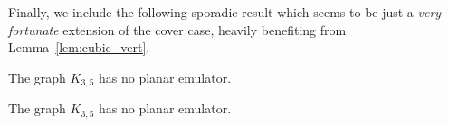 \documentclass[envcountsect,envcountsame]{llncs}
\renewenvironment{accumulate}{}{}
\begin{document}
\begin{accumulate}
Finally, we include the following sporadic result
which seems to be just a {\em very fortunate} extension of the cover case,
heavily benefiting from Lemma~\ref{lem:cubic_vert}.
\end{accumulate}

\begin{theorem}
\label{thm:K35noemul}
The graph $K_{3,5}$ has no planar emulator.
\end{theorem}
\begin{onlyaccum}
{\def\thetheorem{\ref{thm:K35noemul}}
\begin{theorem}
The graph $K_{3,5}$ has no planar emulator.
\end{theorem}}
\end{onlyaccum}
\end{document}
